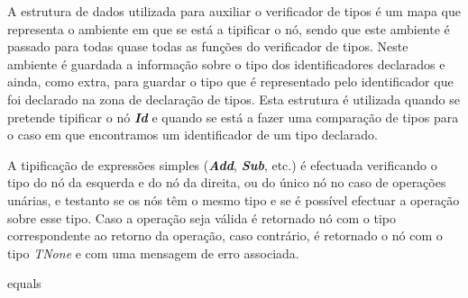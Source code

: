 A estrutura de dados utilizada para auxiliar o verificador de tipos é um mapa que representa o ambiente em que se está a tipificar o nó, sendo que este ambiente é passado para todas quase todas as funções do verificador de tipos. Neste ambiente é guardada a informação sobre o tipo dos identificadores declarados e ainda, como extra, para guardar o tipo que é representado pelo identificador que foi declarado na zona de declaração de tipos. Esta estrutura é utilizada quando se pretende tipificar o nó \emph{\textbf{Id}} e quando se está a fazer uma comparação de tipos para o caso em que encontramos um identificador de um tipo declarado.

A tipificação de expressões simples (\emph{\textbf{Add}}, \emph{\textbf{Sub}}, etc.) é efectuada verificando o tipo do nó da esquerda e do nó da direita, ou do único nó no caso de operações unárias, e testanto se os nós têm o mesmo tipo e se é possível efectuar a operação sobre esse tipo. Caso a operação seja válida é retornado nó com o tipo correspondente ao retorno da operação, caso contrário, é retornado o nó com o tipo \emph{TNone} e com uma mensagem de erro associada.


equals


